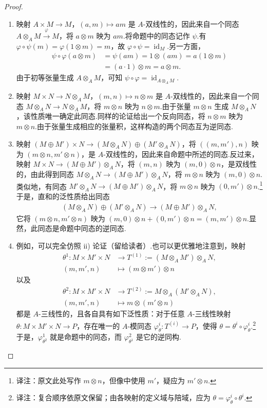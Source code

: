 \begin{proof}
\begin{enumerate}[label=\roman*)]
\item 映射 $A\times M\longrightarrow M$，$(a,m)\mapsto am$ 是 $A$-双线性的，因此来自一个同态 $A\otimes_A M\xrightarrow{\varphi}M$，将 $a\otimes m$ 映为 $am$.将命题中的同态记作 $\psi$.有 $\varphi\circ\psi(m)=\varphi(1\otimes m)=m$，故 $\varphi\circ\psi=\operatorname{id}_M$.另一方面，
\begin{align*}
\psi\circ\varphi(a\otimes m)&=\psi(am)=1\otimes(am)=a(1\otimes m)\\
&=(a\cdot1)\otimes m=a\otimes m.
\end{align*}
由于初等张量生成 $A\otimes_A M$，可知 $\psi\circ\varphi=\operatorname{id}_{A\otimes_A M}$.
\item 映射 $M\times N\longrightarrow N\otimes_A M$，$(m,n)\mapsto n\otimes m$ 是 $A$-双线性的，因此来自一个同态 $M\otimes_A N\longrightarrow N\otimes_A M$，将 $m\otimes n$ 映为 $n\otimes m$.由于张量 $m\otimes n$ 生成 $M\otimes_A N$，该性质唯一确定此同态.同样的论证给出一个反向同态，将 $n\otimes m$ 映为 $m\otimes n$.由于张量生成相应的张量积，这样构造的两个同态互为逆同态.
\item 映射 $(M\oplus M')\times N\longrightarrow(M\otimes_A N)\oplus(M'\otimes_A N)$，将 $((m,m'),n)$ 映为 $(m\otimes n,m'\otimes n)$，是 $A$-双线性的，因此来自命题中所述的同态.反过来，映射 $M\times N\longrightarrow(M\oplus M')\otimes_A N$，将 $(m,n)$ 映为 $(m,0)\otimes n$，是双线性的，由此得到同态 $M\otimes_A N\longrightarrow(M\oplus M')\otimes_A N$，将 $m\otimes n$ 映为 $(m,0)\otimes n$.类似地，有同态 $M'\otimes_A N\longrightarrow(M\oplus M')\otimes_A N$，将 $m\otimes n$ 映为 $(0,m')\otimes n$.\footnote{译注：原文此处写作 $m\otimes n$，但像中使用 $m'$，疑应为 $m'\otimes n$.}于是，直和的泛性质给出同态
\begin{align*}
(M\otimes_A N)\oplus(M'\otimes_A N)\longrightarrow(M\oplus M')\otimes_A N,
\end{align*}
它将 $(m\otimes n,m'\otimes n)$ 映为 $(m,0)\otimes n+(0,m')\otimes n=(m,m')\otimes n$.显然，此同态是命题中同态的逆同态.
\item 例如，可以完全仿照 ii) 论证（留给读者）.也可以更优雅地注意到，映射
\begin{align*}
\theta^1:M\times M'\times N&\longrightarrow T^{(1)}:=(M\otimes_A M')\otimes_A N,\\
(m,m',n)&\longmapsto(m\otimes m')\otimes n
\end{align*}
以及
\begin{align*}
\theta^2:M\times M'\times N&\longrightarrow T^{(2)}:=M\otimes_A(M'\otimes_A N),\\
(m,m',n)&\longmapsto m\otimes(m'\otimes n)
\end{align*}
都是 $A$-三线性的，且各自具有如下泛性质：对于任意 $A$-三线性映射 $\theta:M\times M'\times N\longrightarrow P$，存在唯一的 $A$-模同态 $\varphi_\theta^i:T^{(i)}\longrightarrow P$，使得 $\theta=\theta^i\circ\varphi_\theta^i$.\footnote{译注：复合顺序依原文保留；由各映射的定义域与陪域，应为 $\theta=\varphi_\theta^i\circ\theta^i$.}于是，$\varphi_{\theta^2}^1$ 就是命题中的同态，而 $\varphi_{\theta^1}^2$ 是它的逆同构.
\end{enumerate}
\end{proof}
